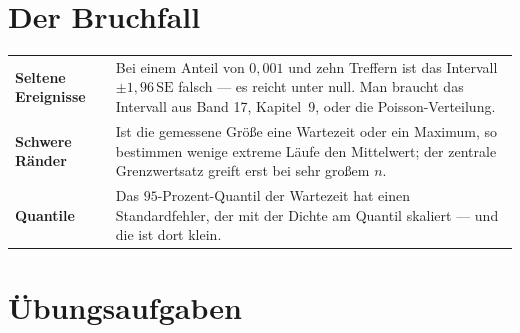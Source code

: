 \section{Der Bruchfall}

\begin{warnung}
\begin{center}
{\small
\renewcommand{\arraystretch}{1.52}
\begin{tabular}{@{}P{2.8cm}P{5.8cm}@{}}
\toprule
\textbf{Seltene Ereignisse} & Bei einem Anteil von $0{,}001$ und zehn Treffern ist das Intervall $\pm1{,}96\,\text{SE}$ falsch --- es reicht unter null. Man braucht das Intervall aus Band 17, Kapitel~9, oder die Poisson-Verteilung.\\
\textbf{Schwere Ränder} & Ist die gemessene Größe eine Wartezeit oder ein Maximum, so bestimmen wenige extreme Läufe den Mittelwert; der zentrale Grenzwertsatz greift erst bei sehr großem $n$.\\
\textbf{Quantile} & Das $95$-Prozent-Quantil der Wartezeit hat einen Standardfehler, der mit der Dichte am Quantil skaliert --- und die ist dort klein.\\
\bottomrule
\end{tabular}}
\end{center}

\begin{center}
\begin{minipage}{0.88\textwidth}
\end{minipage}
\end{center}
\end{warnung}

\section{Übungsaufgaben}

